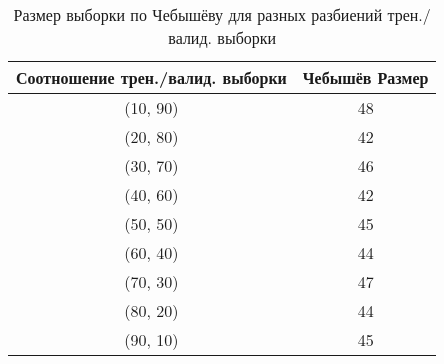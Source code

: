\begin{table}[H]
    \centering
    \caption{Размер выборки по Чебышёву для разных разбиений трен./валид. выборки}
    \begin{tabular}{|c|c|}
    \hline
    Соотношение трен./валид. выборки & Чебышёв Размер \\
    \hline
    (10, 90) & 48 \\
    (20, 80) & 42 \\
    (30, 70) & 46 \\
    (40, 60) & 42 \\
    (50, 50) & 45 \\
    (60, 40) & 44 \\
    (70, 30) & 47 \\
    (80, 20) & 44 \\
    (90, 10) & 45 \\
    \hline
    \end{tabular}
\end{table}

